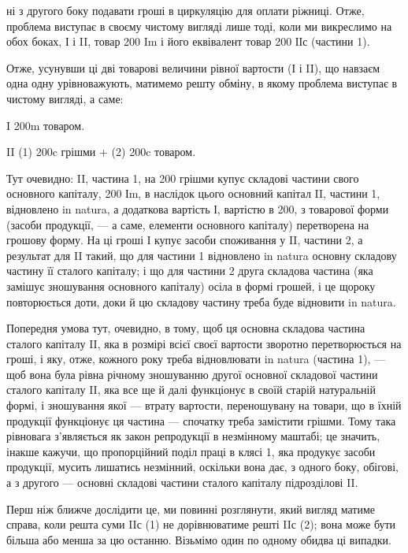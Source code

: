 \parcont{}  %
ні з другого боку подавати гроші в циркуляцію для оплати ріжниці.
Отже, проблема виступає в своєму чистому вигляді лише тоді, коли ми
викреслимо на обох боках, І і II, товар 200 Im і його еквівалент товар
200 ІІс (частини 1).

Отже, усунувши ці дві товарові величини рівної вартости (І і II),
що навзаєм одна одну урівноважують, матимемо решту обміну, в якому
проблема виступає в чистому вигляді, а саме:

I    200m товаром.

II (1) 200c грішми + (2) 200c товаром.

Тут очевидно: II, частина 1, на 200 грішми купує складові частини
свого основного капіталу, 200 Іm, в наслідок цього основний капітал II,
частини 1, відновлено in natura, а додаткова вартість І, вартістю в 200,
з товарової форми (засоби продукції, — а саме, елементи основного
капіталу) перетворена на грошову форму. На ці гроші І купує засоби
споживання у II, частини 2, а результат для II такий, що для частини 1
відновлено in natura основну складову частину її сталого капіталу; і що
для частини 2 друга складова частина (яка замішує зношування основного
капіталу) осіла в формі грошей, і це щороку повторюється доти,
доки й цю складову частину треба буде відновити in natura.

Попередня умова тут, очевидно, в тому, щоб ця основна складова частина
сталого капіталу II, яка в розмірі всієї своєї вартости зворотно перетворюється
на гроші, і яку, отже, кожного року треба відновлювати in natura
(частина 1), — щоб вона була рівна річному зношуванню другої основної
складової частини сталого капіталу II, яка все ще й далі функціонує в
своїй старій натуральній формі, і зношування якої — втрату вартости,
переношувану на товари, що в їхній продукції функціонує ця частина —
спочатку треба замістити грішми. Тому така рівновага з’являється як
закон репродукції в незмінному маштабі; це значить, інакше кажучи, що
пропорційний поділ праці в клясі 1, яка продукує засоби продукції,
мусить лишатись незмінний, оскільки вона дає, з одного боку, обігові,
а з другого — основні складові частини сталого капіталу підрозділові II.

Перш ніж ближче дослідити це, ми повинні розглянути, який вигляд
матиме справа, коли решта суми IIс (1) не дорівнюватиме решті IIс
(2); вона може бути більша або менша за цю останню. Візьмімо один
по одному обидва ці випадки.

